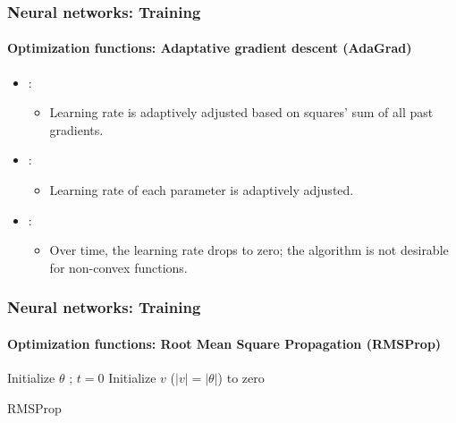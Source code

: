 \documentclass[xcolor=table]{beamer}
\begin{document}
\begin{frame}
	\frametitle{Neural networks: Training}
	\framesubtitle{Optimization functions: Adaptative gradient descent (AdaGrad)}

\begin{itemize}
	\item {}: 
	\begin{itemize}
		\item Learning rate is adaptively adjusted based on squares' sum of all past gradients.
	\end{itemize}
	\item {}: 
	\begin{itemize}
		\item Learning rate of each parameter is adaptively adjusted.
	\end{itemize}
	\item {}: 
	\begin{itemize}
		\item Over time, the learning rate drops to zero; the algorithm is not desirable for non-convex functions.
	\end{itemize}
\end{itemize}

\end{frame}

\begin{frame}
	\frametitle{Neural networks: Training}
	\framesubtitle{Optimization functions: Root Mean Square Propagation (RMSProp)}

\begin{algorithm}[H]
	\KwResult{$ \theta $}
	Initialize $ \theta $ ; $ t = 0 $\;
	Initialize $v$ ($|v| = |\theta|$) to zero\;
	\caption{RMSProp}
\end{algorithm}

\end{frame}
\end{document}
